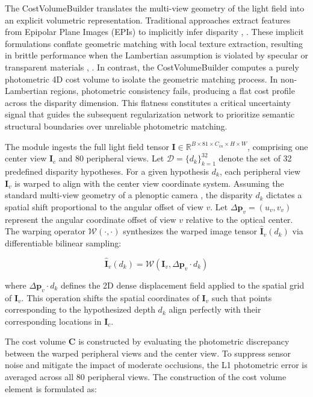 \documentclass[lettersize,journal]{IEEEtran}
\begin{document}
The CostVolumeBuilder translates the multi-view geometry of the light field into an explicit volumetric representation. Traditional approaches extract features from Epipolar Plane Images (EPIs) to implicitly infer disparity \cite{wanner2014}, \cite{heber2018}. These implicit formulations conflate geometric matching with local texture extraction, resulting in brittle performance when the Lambertian assumption is violated by specular or transparent materials \cite{li2021}, \cite{zhang2023}. In contrast, the CostVolumeBuilder computes a purely photometric 4D cost volume to isolate the geometric matching process. In non-Lambertian regions, photometric consistency fails, producing a flat cost profile across the disparity dimension. This flatness constitutes a critical uncertainty signal that guides the subsequent regularization network to prioritize semantic structural boundaries over unreliable photometric matching.

The module ingests the full light field tensor $\mathbf{I} \in \mathbb{R}^{B \times 81 \times C_{in} \times H \times W}$, comprising one center view $\mathbf{I}_c$ and 80 peripheral views. Let $\mathcal{D} = \{d_k\}_{k=1}^{32}$ denote the set of 32 predefined disparity hypotheses. For a given hypothesis $d_k$, each peripheral view $\mathbf{I}_v$ is warped to align with the center view coordinate system. Assuming the standard multi-view geometry of a plenoptic camera \cite{ng2005}, the disparity $d_k$ dictates a spatial shift proportional to the angular offset of view $v$. Let $\Delta \mathbf{p}_v = (u_v, v_v)$ represent the angular coordinate offset of view $v$ relative to the optical center. The warping operator $\mathcal{W}(\cdot, \cdot)$ synthesizes the warped image tensor $\hat{\mathbf{I}}_v(d_k)$ via differentiable bilinear sampling:

\begin{equation}
\hat{\mathbf{I}}_v(d_k) = \mathcal{W}(\mathbf{I}_v, \Delta \mathbf{p}_v \cdot d_k)
\end{equation}

where $\Delta \mathbf{p}_v \cdot d_k$ defines the 2D dense displacement field applied to the spatial grid of $\mathbf{I}_v$. This operation shifts the spatial coordinates of $\mathbf{I}_v$ such that points corresponding to the hypothesized depth $d_k$ align perfectly with their corresponding locations in $\mathbf{I}_c$.

The cost volume $\mathbf{C}$ is constructed by evaluating the photometric discrepancy between the warped peripheral views and the center view. To suppress sensor noise and mitigate the impact of moderate occlusions, the L1 photometric error is averaged across all 80 peripheral views. The construction of the cost volume element is formulated as:
\end{document}
